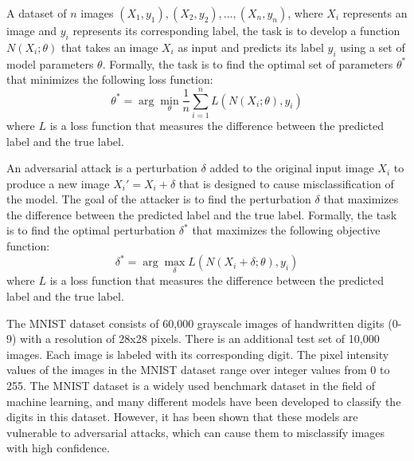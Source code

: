 \newpage
 \label{results_problem_2} 
\hspace{6mm} A dataset of $n$ images ${(X_1, y_1), (X_2, y_2), ..., (X_n, y_n)}$, where $X_i$ represents an image and $y_i$ represents its corresponding label, the task is to develop a function $N(X_i; \theta)$ that takes an image $X_i$ as input and predicts its label $y_i$ using a set of model parameters $\theta$.
\newline Formally, the task is to find the optimal set of parameters $\theta^*$ that minimizes the following loss function:
\begin{equation} \label{problem_daaamd_opt_thita_expression}
    \theta^* = \arg\min_\theta \frac{1}{n}\sum_{i=1}^n L(N(X_i; \theta), y_i)
\end{equation}
\newline where $L$ is a loss function that measures the difference between the predicted label and the true label.

An adversarial attack is a perturbation $\delta$ added to the original input image $X_i$ to produce a new image $X_i' = X_i + \delta$ that is designed to cause misclassification of the model. The goal of the attacker is to find the perturbation $\delta$ that maximizes the difference between the predicted label and the true label.
\newline Formally, the task is to find the optimal perturbation $\delta^*$ that maximizes the following objective function:
\begin{equation} \label{problem_daaamd_adv_delta_expression}
    \delta^* = \arg\max_\delta L(N(X_i + \delta; \theta), y_i)
\end{equation}
\newline where $L$ is a loss function that measures the difference between the predicted label and the true label.

The MNIST dataset consists of 60,000 grayscale images of handwritten digits (0-9) with a resolution of 28x28 pixels. There is an additional test set of 10,000 images. Each image is labeled with its corresponding digit. The pixel intensity values of the images in the MNIST dataset range over integer values from 0 to 255. 
\newline 
The MNIST dataset is a widely used benchmark dataset in the field of machine learning, and many different models have been developed to classify the digits in this dataset. However, it has been shown that these models are vulnerable to adversarial attacks, which can cause them to misclassify images with high confidence.

